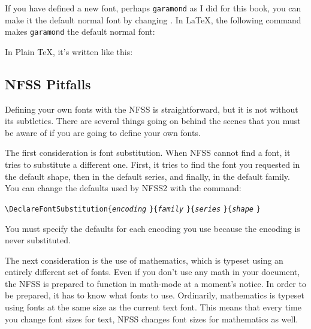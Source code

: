 If you have defined a new font, perhaps \verb|garamond| as I did
for this book, you can make it the default normal font by changing
.  In \LaTeX, the following command makes
\verb|garamond| the default normal font:

\begin{shortexample}
\renewcommand{\rmdefault}{garamond}
\end{shortexample}

\newpage
In Plain \TeX, it's written like this:

\begin{shortexample}
\def\rmdefault{garamond}
\end{shortexample}

\subsection{NFSS Pitfalls}

Defining your own fonts with the NFSS is 
straightforward, but it is not without its subtleties.  There are 
several things going on behind the scenes that you must be aware
of if you are going to define your own fonts.

The first consideration is font substitution.  When NFSS cannot find a
font, it tries to substitute a different one.  First, it tries to find the
font you requested in the default shape, then in the default series, and
finally, in the default family.  You can change the defaults used by NFSS2
with the  command:

\begin{exindent}
  \verb|\DeclareFontSubstitution{|\texttt{\textit{encoding}}%
  \verb|}{|\texttt{\textit{family}}%
  \verb|}{|\texttt{\textit{series}}%
  \verb|}{|\texttt{\textit{shape}}%
  \verb|}|
\end{exindent}

You must specify the defaults for each encoding you use because
the encoding is never substituted.

The next consideration is the use of 
mathematics,
which is typeset
using an entirely different set of fonts. Even if you don't use
any math in your document, the NFSS is prepared to function in math-mode
at a moment's notice.  In order to be prepared, it has to know what fonts
to use.  Ordinarily, mathematics is typeset using fonts at the same size
as the current text font.  This means that every time you change font sizes
for text, NFSS changes font sizes for mathematics as well.

